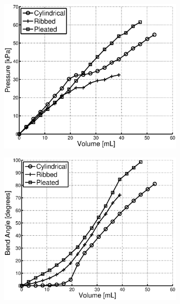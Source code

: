 \begin{figure}[htb]
        \centering
        \begin{subfigure}[b]{0.95\columnwidth}
            \centering
            \includegraphics[width=0.95\columnwidth]{figures/actuators/morphologiescharacterization/PressureVsVolume.eps}
            \caption{}
            \label{fig:Characterization_PressureVsVolume}
        \end{subfigure}
        \begin{subfigure}[b]{0.95\columnwidth}
            \centering
            \includegraphics[width=0.95\columnwidth]{figures/actuators/morphologiescharacterization/BendAngleVsVolume.eps}

\end{subfigure}
\end{figure}
